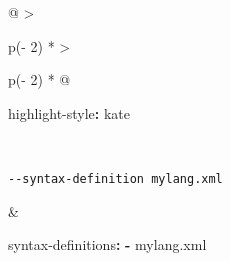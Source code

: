 \documentclass[
  a4paper,
]{article}
\newenvironment{Shaded}{}{}
\newcommand{\AttributeTok}[1]{\textcolor[rgb]{0.49,0.56,0.16}{#1}}
\newcommand{\FunctionTok}[1]{\textcolor[rgb]{0.02,0.16,0.49}{#1}}
\newcommand{\KeywordTok}[1]{\textcolor[rgb]{0.00,0.44,0.13}{\textbf{#1}}}
\begin{document}
\begin{longtable}[]{@{}
  >{\raggedright\arraybackslash}p{(\columnwidth - 2\tabcolsep) * }
  >{\raggedright\arraybackslash}p{(\columnwidth - 2\tabcolsep) * }@{}}
\begin{minipage}[t]{\linewidth}
\begin{Shaded}
\begin{Highlighting}[]
\FunctionTok{highlight{-}style}\KeywordTok{:}\AttributeTok{ kate}
\end{Highlighting}
\end{Shaded}
\end{minipage} \\
\begin{minipage}[t]{\linewidth}\raggedright
\begin{verbatim}
--syntax-definition mylang.xml
\end{verbatim}
\end{minipage} & \begin{minipage}[t]{\linewidth}\raggedright
\begin{Shaded}
\begin{Highlighting}[]
\FunctionTok{syntax{-}definitions}\KeywordTok{:}
\AttributeTok{  }\KeywordTok{{-}}\AttributeTok{ mylang.xml}
\end{Highlighting}
\end{Shaded}


\end{minipage}
\end{longtable}
\end{document}
